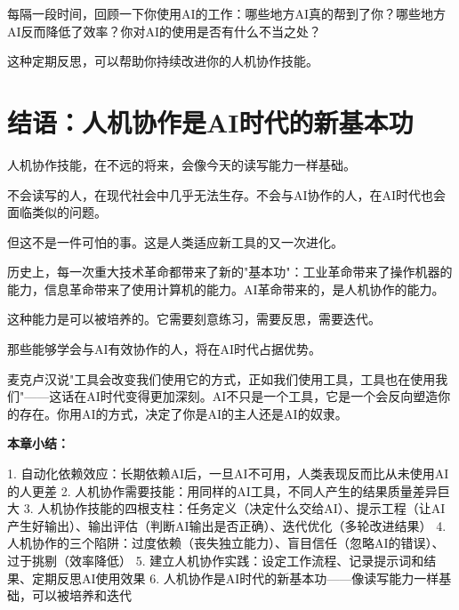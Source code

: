 每隔一段时间，回顾一下你使用AI的工作：哪些地方AI真的帮到了你？哪些地方AI反而降低了效率？你对AI的使用是否有什么不当之处？

这种定期反思，可以帮助你持续改进你的人机协作技能。

\section{结语：人机协作是AI时代的新基本功}


人机协作技能，在不远的将来，会像今天的读写能力一样基础。

不会读写的人，在现代社会中几乎无法生存。不会与AI协作的人，在AI时代也会面临类似的问题。

但这不是一件可怕的事。这是人类适应新工具的又一次进化。

历史上，每一次重大技术革命都带来了新的"基本功"：工业革命带来了操作机器的能力，信息革命带来了使用计算机的能力。AI革命带来的，是人机协作的能力。

这种能力是可以被培养的。它需要刻意练习，需要反思，需要迭代。

那些能够学会与AI有效协作的人，将在AI时代占据优势。

麦克卢汉说"工具会改变我们使用它的方式，正如我们使用工具，工具也在使用我们"——这话在AI时代变得更加深刻。AI不只是一个工具，它是一个会反向塑造你的存在。你用AI的方式，决定了你是AI的主人还是AI的奴隶。


\textbf{本章小结：}

1. 自动化依赖效应：长期依赖AI后，一旦AI不可用，人类表现反而比从未使用AI的人更差
2. 人机协作需要技能：用同样的AI工具，不同人产生的结果质量差异巨大
3. 人机协作技能的四根支柱：任务定义（决定什么交给AI）、提示工程（让AI产生好输出）、输出评估（判断AI输出是否正确）、迭代优化（多轮改进结果）
4. 人机协作的三个陷阱：过度依赖（丧失独立能力）、盲目信任（忽略AI的错误）、过于挑剔（效率降低）
5. 建立人机协作实践：设定工作流程、记录提示词和结果、定期反思AI使用效果
6. 人机协作是AI时代的新基本功——像读写能力一样基础，可以被培养和迭代
